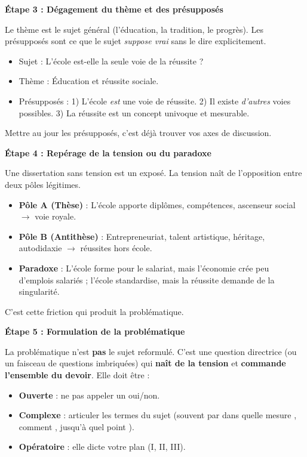\documentclass[11pt]{article}
\newcommand{\cle}[1]{{\popxbold\color{popdark}#1}}
\begin{document}
\textbf{Étape 3 : Dégagement du thème et des présupposés}\par
Le \cle{thème} est le sujet général (l'éducation, la tradition, le progrès). Les \cle{présupposés} sont ce que le sujet \emph{suppose vrai} sans le dire explicitement.
\begin{itemize}
    \item Sujet : \og L'école est-elle la seule voie de la réussite ? \fg{}
    \item Thème : Éducation et réussite sociale.
    \item Présupposés : 1) L'école \emph{est} une voie de réussite. 2) Il existe \emph{d'autres} voies possibles. 3) La \og réussite \fg{} est un concept univoque et mesurable.
\end{itemize}
Mettre au jour les présupposés, c'est déjà trouver vos axes de discussion.

\textbf{Étape 4 : Repérage de la tension ou du paradoxe}\par
Une dissertation sans tension est un exposé. La tension naît de l'opposition entre deux pôles légitimes.
\begin{itemize}
    \item \textbf{Pôle A (Thèse)} : L'école apporte diplômes, compétences, ascenseur social $\rightarrow$ voie royale.
    \item \textbf{Pôle B (Antithèse)} : Entrepreneuriat, talent artistique, héritage, autodidaxie $\rightarrow$ réussites hors école.
    \item \textbf{Paradoxe} : L'école forme pour le salariat, mais l'économie crée peu d'emplois salariés ; l'école standardise, mais la réussite demande de la singularité.
\end{itemize}
C'est cette friction qui produit la problématique.

\textbf{Étape 5 : Formulation de la problématique}\par
La problématique n'est \textbf{pas} le sujet reformulé. C'est une \cle{question directrice} (ou un faisceau de questions imbriquées) qui \textbf{naît de la tension} et \textbf{commande l'ensemble du devoir}. Elle doit être :
\begin{itemize}
    \item \textbf{Ouverte} : ne pas appeler un oui/non.
    \item \textbf{Complexe} : articuler les termes du sujet (souvent par \og dans quelle mesure \fg{}, \og comment \fg{}, \og jusqu'à quel point \fg{}).
    \item \textbf{Opératoire} : elle dicte votre plan (I, II, III).
\end{itemize}
\end{document}
